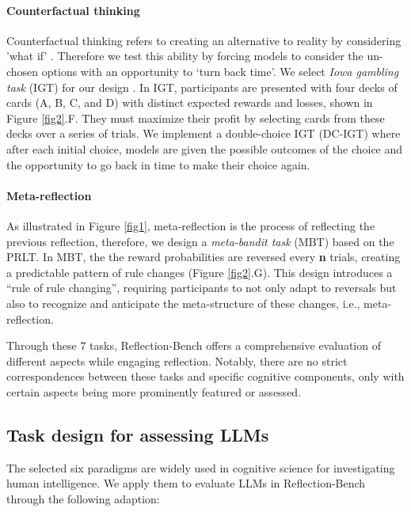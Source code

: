 \paragraph{Counterfactual thinking} Counterfactual thinking refers to creating an alternative to reality by considering 'what if' \cite{annurev-psych-122414-033249}. Therefore we test this ability by forcing models to consider the un-chosen options with an opportunity to `turn back time'. We select \textit{Iowa gambling task }(IGT) for our design \cite{buelow2009construct}. In IGT, participants are presented with four decks of cards (A, B, C, and D) with distinct expected rewards and losses, shown in Figure \ref{fig2}.F. They must maximize their profit by selecting cards from these decks over a series of trials. We implement a double-choice IGT (DC-IGT) where after each initial choice, models are given the possible outcomes of the choice and the opportunity to go back in time to make their choice again.

\paragraph{Meta-reflection} As illustrated in Figure \ref{fig1}, meta-reflection is the process of reflecting the previous reflection, therefore, we design a \textit{meta-bandit task} (MBT) based on the PRLT. In MBT, the the reward probabilities are reversed every \textbf{n} trials, creating a predictable pattern of rule changes (Figure \ref{fig2}.G).  This design introduces a ``rule of rule changing'', requiring participants to not only adapt to reversals but also to recognize and anticipate the meta-structure of these changes, i.e., meta-reflection.

Through these 7 tasks, Reflection-Bench offers a comprehensive evaluation of different aspects while engaging reflection. Notably, there are no strict correspondences between these tasks and specific cognitive components, only with certain aspects being more prominently featured or assessed.

\subsection{Task design for assessing LLMs}

The selected six paradigms are widely used in cognitive science for investigating human intelligence. We apply them to evaluate LLMs in Reflection-Bench through the following adaption:

